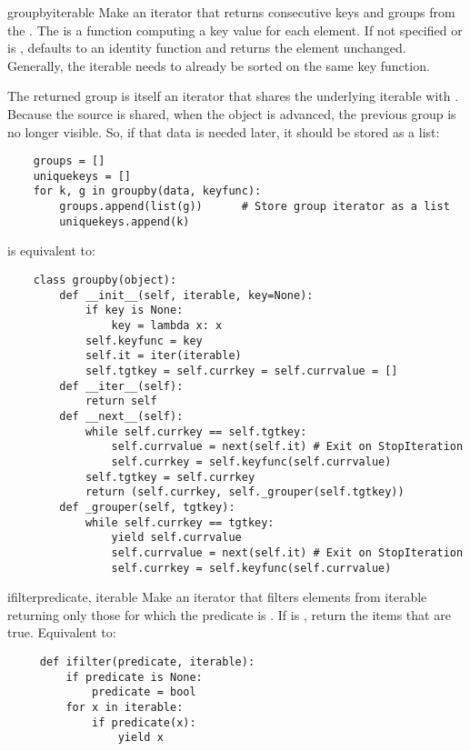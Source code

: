 \begin{funcdesc}{groupby}{iterable}
  Make an iterator that returns consecutive keys and groups from the
  . The  is a function computing a key value for each
  element.  If not specified or is ,  defaults to an
  identity function and returns  the element unchanged.  Generally, the
  iterable needs to already be sorted on the same key function.

  The returned group is itself an iterator that shares the underlying
  iterable with .  Because the source is shared, when
  the  object is advanced, the previous group is no
  longer visible.  So, if that data is needed later, it should be stored
  as a list:

  \begin{verbatim}
    groups = []
    uniquekeys = []
    for k, g in groupby(data, keyfunc):
        groups.append(list(g))      # Store group iterator as a list
        uniquekeys.append(k)
  \end{verbatim}

   is equivalent to:

  \begin{verbatim}
    class groupby(object):
        def __init__(self, iterable, key=None):
            if key is None:
                key = lambda x: x
            self.keyfunc = key
            self.it = iter(iterable)
            self.tgtkey = self.currkey = self.currvalue = []
        def __iter__(self):
            return self
        def __next__(self):
            while self.currkey == self.tgtkey:
                self.currvalue = next(self.it) # Exit on StopIteration
                self.currkey = self.keyfunc(self.currvalue)
            self.tgtkey = self.currkey
            return (self.currkey, self._grouper(self.tgtkey))
        def _grouper(self, tgtkey):
            while self.currkey == tgtkey:
                yield self.currvalue
                self.currvalue = next(self.it) # Exit on StopIteration
                self.currkey = self.keyfunc(self.currvalue)
  \end{verbatim}
\end{funcdesc}

\begin{funcdesc}{ifilter}{predicate, iterable}
  Make an iterator that filters elements from iterable returning only
  those for which the predicate is .
  If  is , return the items that are true.
  Equivalent to:

  \begin{verbatim}
     def ifilter(predicate, iterable):
         if predicate is None:
             predicate = bool
         for x in iterable:
             if predicate(x):
                 yield x
  \end{verbatim}
\end{funcdesc}

